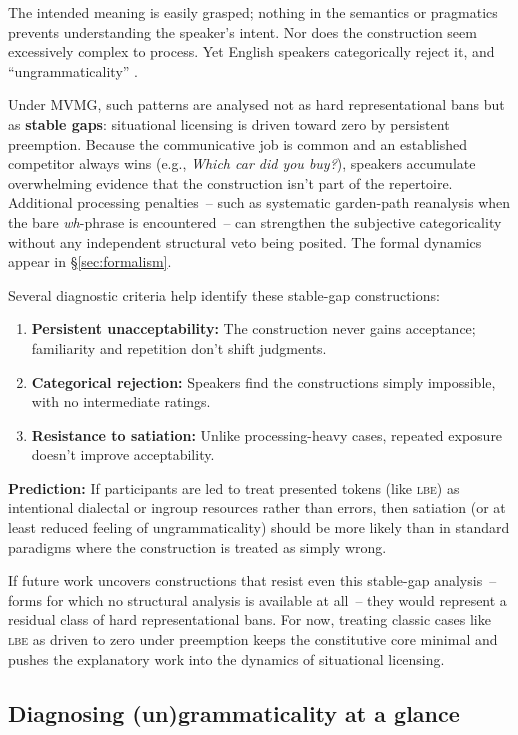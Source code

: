 \documentclass[12pt,letterpaper]{article}
\newcommand{\mention}[1]{\textit{#1}}
\newcommand{\abbr}[1]{\textsc{#1}}
\begin{document}
The intended meaning is easily grasped; nothing in the semantics or pragmatics prevents understanding the speaker's intent. Nor does the construction seem excessively complex to process. Yet English speakers categorically reject it, and \enquote{ungrammaticality} \autocite[22]{Snyder2022}.

Under MVMG, such patterns are analysed not as hard representational bans but as \textbf{stable gaps}: situational licensing is driven toward zero by persistent preemption. Because the communicative job is common and an established competitor always wins (e.g., \mention{Which car did you buy?}), speakers accumulate overwhelming evidence that the construction isn't part of the repertoire. Additional processing penalties~-- such as systematic garden-path reanalysis when the bare \textit{wh}-phrase is encountered~-- can strengthen the subjective categoricality without any independent structural veto being posited. The formal dynamics appear in \S\ref{sec:formalism}.

Several diagnostic criteria help identify these stable-gap constructions:
\begin{enumerate}
\item \textbf{Persistent unacceptability:} The construction never gains acceptance; familiarity and repetition don't shift judgments.
\item \textbf{Categorical rejection:} Speakers find the constructions simply impossible, with no intermediate ratings.
\item \textbf{Resistance to satiation:} Unlike processing-heavy cases, repeated exposure doesn't improve acceptability.
\end{enumerate}

\textbf{Prediction:} If participants are led to treat presented tokens (like \abbr{lbe}) as intentional dialectal or ingroup resources rather than errors, then satiation (or at least reduced feeling of ungrammaticality) should be more likely than in standard paradigms where the construction is treated as simply wrong.

If future work uncovers constructions that resist even this stable-gap analysis~-- forms for which no structural analysis is available at all~-- they would represent a residual class of hard representational bans. For now, treating classic cases like \abbr{lbe} as driven to zero under preemption keeps the constitutive core minimal and pushes the explanatory work into the dynamics of situational licensing.

\subsection{Diagnosing (un)grammaticality at a glance}
\label{sec:diag-tree}
\end{document}
